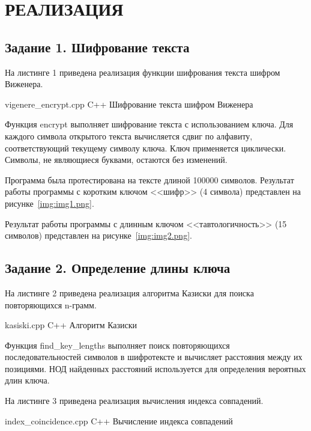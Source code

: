 \chapter*{РЕАЛИЗАЦИЯ}

\section*{Задание 1. Шифрование текста}

На листинге 1 приведена реализация функции шифрования текста шифром Виженера.

    {vigenere_encrypt.cpp}
    {C++}
    {Шифрование текста шифром Виженера}

Функция encrypt выполняет шифрование текста с использованием ключа. Для каждого символа открытого текста вычисляется сдвиг по алфавиту, соответствующий текущему символу ключа. Ключ применяется циклически. Символы, не являющиеся буквами, остаются без изменений.

Программа была протестирована на тексте длиной 100000 символов. Результат работы программы с коротким ключом <<шифр>> (4 символа) представлен на рисунке~\ref{img:img1.png}.


Результат работы программы с длинным ключом <<тавтологичность>> (15 символов) представлен на рисунке~\ref{img:img2.png}.


\section*{Задание 2. Определение длины ключа}

На листинге 2 приведена реализация алгоритма Казиски для поиска повторяющихся n-грамм.

    {kasiski.cpp}
    {C++}
    {Алгоритм Казиски}

Функция find\_key\_lengths выполняет поиск повторяющихся последовательностей символов в шифротексте и вычисляет расстояния между их позициями. НОД найденных расстояний используется для определения вероятных длин ключа.

На листинге 3 приведена реализация вычисления индекса совпадений.

    {index_coincidence.cpp}
    {C++}
    {Вычисление индекса совпадений}

